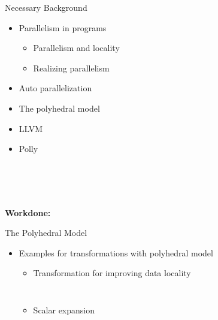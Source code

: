 \documentclass{beamer}
\begin{document}
\begin{frame}{Necessary Background}
\begin{itemize}
\item Parallelism in programs
	\begin{itemize}
	\item Parallelism and locality
	\item Realizing parallelism
	\end{itemize}
\item Auto parallelization
\item The polyhedral model
\item LLVM
\item Polly \\
\end{itemize}
\pause
\ \\
\ \\
\ \\	
\begin{center}
{\textbf {Workdone: \color{red}{"OpenMP Code Generation in Polly"}}}
\end{center}
\end{frame}


\begin{frame}{The Polyhedral Model}
\begin{itemize}
\item Examples for transformations with polyhedral model
	\begin{itemize}
	\item Transformation for improving data locality
	\begin{columns}[t]
	\pause
		\begin{block}{ }
	{\tiny}
		\end{block}


	\pause
		\column{.5\textwidth}
		\begin{block}{ }
	{\tiny}
		\end{block}
	\end{columns}
	\pause
	\item Scalar expansion
	\pause
	\begin{columns}[t]
		\begin{block}{ }
		{\tiny}
		\end{block}
	\pause
		\column{.5\textwidth}
		\begin{block}{ }
		{\tiny}
		\end{block}
	\end{columns}
        \pause
	\begin{columns}
	\column{0.5\textwidth}
		\begin{block}{ }
		{\tiny}
		\end{block}
		\end{columns}
	\end{itemize}
\end{itemize}
\end{frame}
\end{document}
